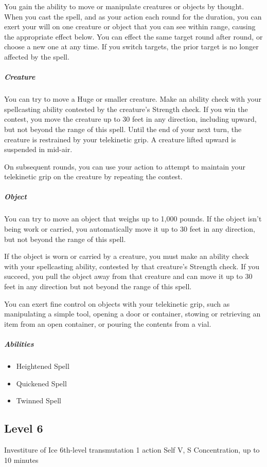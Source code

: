 \documentclass[a4paper,openany,twocolumn]{book}
\begin{document}
You gain the ability to move or manipulate creatures or objects by thought. When you cast the spell, and as your action each round for the duration, you can exert your will on one creature or object that you can see within range, causing the appropriate effect below. You can effect the same target round after round, or choose a new one at any time. If you switch targets, the prior target is no longer affected by the spell.

\subparagraph*{Creature} You can try to move a Huge or smaller creature. Make an ability check with your spellcasting ability contested by the creature's Strength check. If you win the contest, you move the creature up to 30 feet in any direction, including upward, but not beyond the range of this spell. Until the end of your next turn, the creature is restrained by your telekinetic grip. A creature lifted upward is suspended in mid-air.

On subsequent rounds, you can use your action to attempt to maintain your telekinetic grip on the creature by repeating the contest.

\subparagraph*{Object} You can try to move an object that weighs up to 1,000 pounds. If the object isn't being work or carried, you automatically move it up to 30 feet in any direction, but not beyond the range of this spell.

If the object is worn or carried by a creature, you must make an ability check with your spellcasting ability, contested by that creature's Strength check. If you succeed, you pull the object away from that creature and can move it up to 30 feet in any direction but not beyond the range of this spell.

You can exert fine control on objects with your telekinetic grip, such as manipulating a simple tool, opening a door or container, stowing or retrieving an item from an open container, or pouring the contents from a vial.

\subparagraph*{Abilities}
\begin{itemize}
  \item Heightened Spell
  \item Quickened Spell
  \item Twinned Spell
\end{itemize}


\subsection*{Level 6}

\DndSpellHeader
  {Investiture of Ice}
  {6th-level transmutation}
  {1 action}
  {Self}
  {V, S}
  {Concentration, up to 10 minutes}
\end{document}
